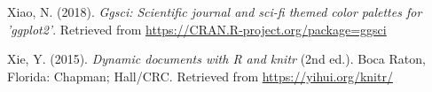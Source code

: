 \documentclass[
  english,
  jou,floatsintext]{apa6}
\newlength{\cslhangindent}
\newenvironment{CSLReferences}[2] %
 {%
  \setlength{\parindent}{0pt}
  \ifodd #1 \everypar{\setlength{\hangindent}{\cslhangindent}}\ignorespaces\fi
  \ifnum #2 > 0
  \setlength{\parskip}{#2\baselineskip}
  \fi
 }%
 {}
\begin{document}
\begin{CSLReferences}{1}{0}
\leavevmode{}%
Xiao, N. (2018). \emph{Ggsci: Scientific journal and sci-fi themed color palettes for 'ggplot2'}. Retrieved from \url{https://CRAN.R-project.org/package=ggsci}

\leavevmode{}%
Xie, Y. (2015). \emph{Dynamic documents with {R} and knitr} (2nd ed.). Boca Raton, Florida: Chapman; Hall/CRC. Retrieved from \url{https://yihui.org/knitr/}

\end{CSLReferences}

\endgroup


\clearpage
\renewcommand{\listfigurename}{Figure captions}
\end{document}
